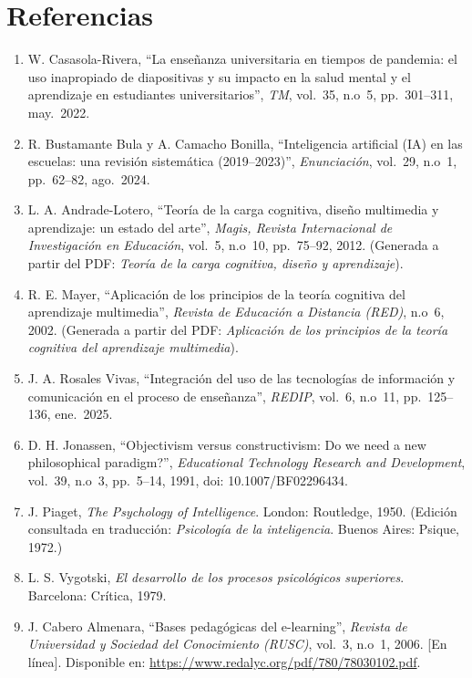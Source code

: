 \documentclass[11pt]{article}
\begin{document}
\section*{Referencias}
\begin{enumerate}
    \item W. Casasola-Rivera, ``La enseñanza universitaria en tiempos de pandemia: el uso inapropiado de diapositivas y su impacto en la salud mental y el aprendizaje en estudiantes universitarios'', \textit{TM}, vol.~35, n.o~5, pp.~301--311, may.~2022.
    \item R. Bustamante Bula y A. Camacho Bonilla, ``Inteligencia artificial (IA) en las escuelas: una revisión sistemática (2019--2023)'', \textit{Enunciación}, vol.~29, n.o~1, pp.~62--82, ago.~2024.
    \item L. A. Andrade-Lotero, ``Teoría de la carga cognitiva, diseño multimedia y aprendizaje: un estado del arte'', \textit{Magis, Revista Internacional de Investigación en Educación}, vol.~5, n.o~10, pp.~75--92, 2012. (Generada a partir del PDF: \textit{Teoría de la carga cognitiva, diseño y aprendizaje}).
    \item R. E. Mayer, ``Aplicación de los principios de la teoría cognitiva del aprendizaje multimedia'', \textit{Revista de Educación a Distancia (RED)}, n.o~6, 2002. (Generada a partir del PDF: \textit{Aplicación de los principios de la teoría cognitiva del aprendizaje multimedia}).
    \item J. A. Rosales Vivas, ``Integración del uso de las tecnologías de información y comunicación en el proceso de enseñanza'', \textit{REDIP}, vol.~6, n.o~11, pp.~125--136, ene.~2025.
    \item D. H. Jonassen, ``Objectivism versus constructivism: Do we need a new philosophical paradigm?'', \textit{Educational Technology Research and Development}, vol.~39, n.o~3, pp.~5--14, 1991, doi: 10.1007/BF02296434.
    \item J. Piaget, \textit{The Psychology of Intelligence}. London: Routledge, 1950. (Edición consultada en traducción: \textit{Psicología de la inteligencia}. Buenos Aires: Psique, 1972.)
    \item L. S. Vygotski, \textit{El desarrollo de los procesos psicológicos superiores}. Barcelona: Crítica, 1979.
    \item J. Cabero Almenara, ``Bases pedagógicas del e-learning'', \textit{Revista de Universidad y Sociedad del Conocimiento (RUSC)}, vol.~3, n.o~1, 2006. [En línea]. Disponible en: \url{https://www.redalyc.org/pdf/780/78030102.pdf}.

\end{enumerate}
\end{document}
